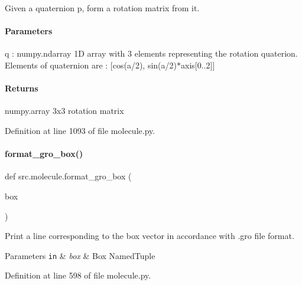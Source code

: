 Given a quaternion p, form a rotation matrix from it. 

\paragraph*{Parameters }

q \+: numpy.\+ndarray 1D array with 3 elements representing the rotation quaterion. Elements of quaternion are \+: \mbox{[}cos(a/2), sin(a/2)$\ast$axis\mbox{[}0..2\mbox{]}\mbox{]}

\paragraph*{Returns }

numpy.\+array 3x3 rotation matrix 

Definition at line 1093 of file molecule.\+py.

\mbox{\label{namespacesrc_1_1molecule_a373f82faf5d8f3ce84095ed74ab77425}} 
\paragraph{\texorpdfstring{format\+\_\+gro\+\_\+box()}{format\_gro\_box()}}
{\footnotesize\ttfamily def src.\+molecule.\+format\+\_\+gro\+\_\+box (\begin{DoxyParamCaption}\item[{}]{box }\end{DoxyParamCaption})}



Print a line corresponding to the box vector in accordance with .gro file format. 


\begin{DoxyParams}[1]{Parameters}
\mbox{\tt in}  & {\em box} & Box Named\+Tuple \\
\hline
\end{DoxyParams}


Definition at line 598 of file molecule.\+py.

\mbox{\label{namespacesrc_1_1molecule_a081f51f922805fee2d219661d7d31743}} 
